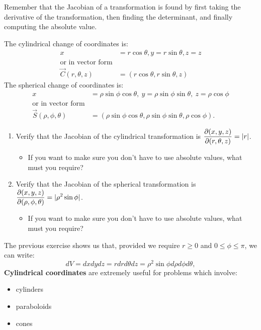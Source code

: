 Remember that the Jacobian of a transformation is found by first taking the derivative of the transformation, then finding the determinant, and finally computing the absolute value.\\

\begin{problem}
 The cylindrical change of coordinates is: 
\begin{align*}
	x&=r\cos\theta, y=r\sin\theta, z=z\\
	\text{or in vector form}&\  \\
	\vec C(r,\theta,z) &= (r\cos\theta,r\sin\theta, z)
\end{align*}  
The spherical change of coordinates is: 
\begin{align*}
	x&=\rho\sin\phi\cos\theta,\ y=\rho\sin\phi\sin\theta,\ z=\rho\cos\phi\\
	\text{or in vector form}&\ \\
	\vec S(\rho,\phi,\theta) &= (\rho\sin\phi\cos\theta,\rho\sin\phi\sin\theta,\rho\cos\phi). 
\end{align*}

\begin{enumerate}
 \item Verify that the Jacobian of the cylindrical transformation is $\displaystyle\frac{\partial(x,y,z)}{\partial(r,\theta,z)} = |r|$.  
	\begin{itemize}
		\item If you want to make sure you don't have to use absolute values, what must you require?
	\end{itemize}
 \item Verify that the Jacobian of the spherical transformation is $\displaystyle\frac{\partial(x,y,z)}{\partial(\rho,\phi,\theta)} = |\rho^2\sin\phi|$.  
	\begin{itemize}
		\item If you want to make sure you don't have to use absolute values, what must you require?
	\end{itemize}
\end{enumerate}
\end{problem}

The previous exercise shows us that, provided we require $r\geq0$ and $0\leq \phi\leq \pi$, we can write:
$$dV=dxdydz = rdrd\theta dz = \rho^2\sin\phi d\rho d\phi d\theta,$$
\vskip0.1in
\textbf{Cylindrical coordinates} are extremely useful for problems which involve:
\begin{itemize}\itemsep2pt
\item cylinders
\item paraboloids
\item cones
\end{itemize}

